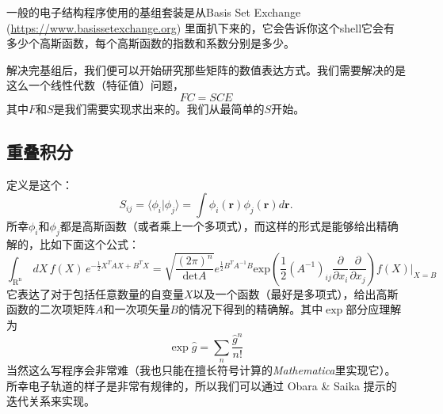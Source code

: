 \documentclass[12pt,a4paper,openany,twoside]{book}
\numberwithin{equation}{section}
\begin{document}
          一般的电子结构程序使用的基组套装是从Basis Set Exchange (\url{https://www.basissetexchange.org}) 里面扒下来的，它会告诉你这个shell它会有多少个高斯函数，每个高斯函数的指数和系数分别是多少。

          解决完基组后，我们便可以开始研究那些矩阵的数值表达方式。我们需要解决的是这么一个线性代数（特征值）问题，
            \begin{equation}
                F C = S C E
            \end{equation}
            其中$F$和$S$是我们需要实现求出来的。我们从最简单的$S$开始。

        \subsection{重叠积分}
          定义是这个：
          \begin{equation}
              S_{ij} = \langle \phi_i | \phi_j \rangle = \int \phi_i(\boldsymbol{r}) \phi_j(\boldsymbol{r}) d \boldsymbol{r}.
          \end{equation}
          所幸$\phi_i$和$\phi_j$都是高斯函数（或者乘上一个多项式），而这样的形式是能够给出精确解的，比如下面这个公式：
          \begin{equation}
              \int_\mathrm{R^n}\, dX \, f(X)\,e^{-\frac{1}{2}X^T A X + B^T X }= \sqrt{\frac{(2\pi)^n}{\mathrm{det} A}}e^{\frac{1}{2}B^T A^{-1}B} \mathrm{exp}\left(\frac{1}{2}(A^{-1})_{ij} \frac{\partial}{\partial x_i}\frac{\partial}{\partial x_j}\right) f(X) \bigg|_{X=B}
          \end{equation}
          它表达了对于包括任意数量的自变量$X$以及一个函数（最好是多项式），给出高斯函数的二次项矩阵$A$和一次项矢量$B$的情况下得到的精确解。其中$\exp$部分应理解为
          \begin{equation}
              \exp{\hat{g}} = \sum_n \frac{\hat{g}^n}{n!}
          \end{equation}
          当然这么写程序会非常难（我也只能在擅长符号计算的\emph{Mathematica}里实现它）。所幸电子轨道的样子是非常有规律的，所以我们可以通过 Obara \& Saika 提示的迭代关系来实现。
\end{document}
